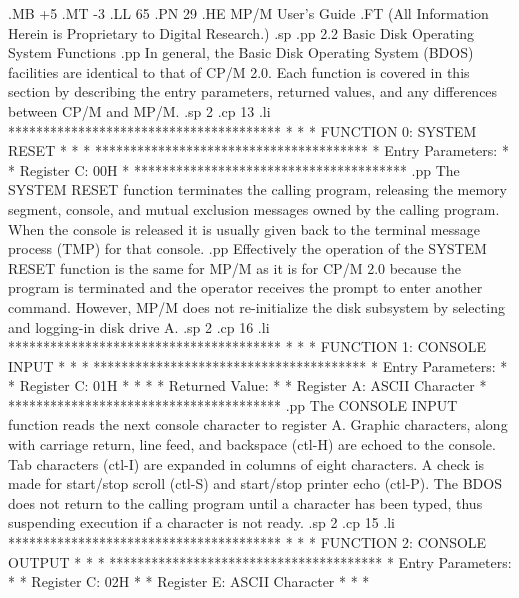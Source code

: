 .MB +5
.MT -3
.LL 65
.PN 29
.HE MP/M User's Guide
.FT   (All Information Herein is Proprietary to Digital Research.)
.sp
.pp
2.2  Basic Disk Operating System Functions
.pp
In general, the Basic Disk Operating System (BDOS) facilities are
identical to that of CP/M 2.0.  Each function is covered in this
section by describing the
entry parameters, returned values, and any differences between
CP/M and MP/M.
.sp 2
.cp 13
.li
***************************************
*                                     *
*  FUNCTION 0:  SYSTEM RESET          *
*                                     *
***************************************
*  Entry Parameters:                  *
*      Register   C:  00H             *
***************************************
.pp
The SYSTEM RESET function terminates the calling program,
releasing the memory segment, console, and mutual exclusion
messages owned by the calling program.
When the console is released it is usually given back to the
terminal message process (TMP) for that console.
.pp
Effectively the operation of the SYSTEM RESET function is the
same for MP/M     as it is for CP/M 2.0 because the program
is terminated and the operator receives the prompt to
enter another command.
However, MP/M does not re-initialize the disk subsystem
by selecting and logging-in disk drive A.
.sp 2
.cp 16
.li
***************************************
*                                     *
*  FUNCTION 1:  CONSOLE INPUT         *
*                                     *
***************************************
*  Entry Parameters:                  *
*      Register   C:  01H             *
*                                     *
*  Returned   Value:                  *
*      Register   A:  ASCII Character *
***************************************
.pp
The CONSOLE INPUT function reads the next console character
to register A.  Graphic characters, along with carriage return,
line feed, and backspace (ctl-H) are echoed to the console.
Tab characters (ctl-I) are expanded in columns of eight
characters.  A check is made for start/stop scroll (ctl-S)
and start/stop printer echo (ctl-P).
The BDOS does not return to the calling program until a character
has been typed, thus suspending execution if a character is
not ready.
.sp 2
.cp 15
.li
***************************************
*                                     *
*  FUNCTION 2:  CONSOLE OUTPUT        *
*                                     *
***************************************
*  Entry Parameters:                  *
*      Register   C:  02H             *
*      Register   E:  ASCII Character *
*                                     *

